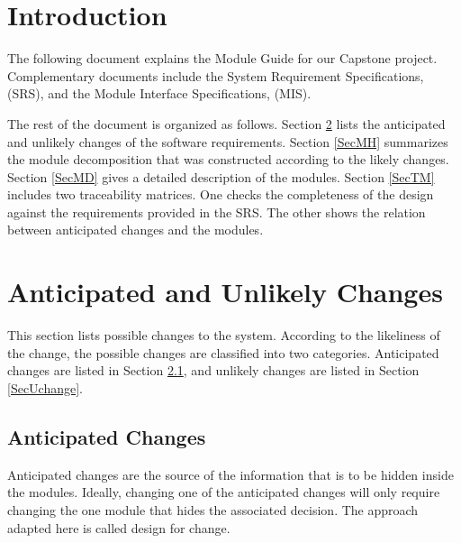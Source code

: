 \documentclass[12pt, titlepage]{article}
\begin{document}
\tableofcontents

\listoftables


\newpage


\section{Introduction}

The following document explains the Module Guide for our Capstone project. Complementary documents include the System Requirement Specifications, (SRS), and the Module Interface Specifications, (MIS). 

The rest of the document is organized as follows. Section
\ref{SecChange} lists the anticipated and unlikely changes of the software
requirements. Section \ref{SecMH} summarizes the module decomposition that
was constructed according to the likely changes. Section \ref{SecMD} gives a detailed description of the modules. Section \ref{SecTM} includes two traceability matrices. One checks
the completeness of the design against the requirements provided in the SRS. The
other shows the relation between anticipated changes and the modules.

\section{Anticipated and Unlikely Changes} \label{SecChange}

This section lists possible changes to the system. According to the likeliness
of the change, the possible changes are classified into two
categories. Anticipated changes are listed in Section \ref{SecAchange}, and
unlikely changes are listed in Section \ref{SecUchange}.

\subsection{Anticipated Changes} \label{SecAchange}

Anticipated changes are the source of the information that is to be hidden
inside the modules. Ideally, changing one of the anticipated changes will only
require changing the one module that hides the associated decision. The approach
adapted here is called design for
change.
\end{document}
